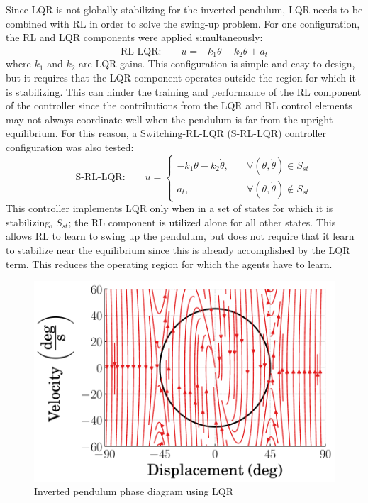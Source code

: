 Since LQR is not globally stabilizing for the inverted pendulum,
LQR needs to be combined with RL in order to solve the swing-up problem.
%
%
For one configuration, the RL and LQR components were applied simultaneously:
%
\begin{equation}
    \qquad\qquad\text{RL-LQR:} \qquad  u= -k_1\theta - k_2\dot{\theta} + a_t \qquad
\label{eq_chap2:RL_LQR_controller}
\end{equation}
%
where $k_1$ and $k_2$ are LQR gains. 
This configuration is simple and easy to design, but it requires that the LQR component operates outside the region for which it is stabilizing. This can hinder the training and performance of the RL component of the controller since the contributions from the LQR and RL control elements may not always coordinate well when the pendulum is far from the upright equilibrium. For this reason, a Switching-RL-LQR (S-RL-LQR) controller configuration was also tested:
%
\begin{equation}
    \qquad\qquad\text{S-RL-LQR:} \qquad u= 
\left\{
    \begin{array}{cl}
        -k_1\theta - k_2\dot{\theta}, & \quad \forall (\theta, \dot{\theta}) \in S_{st}\\
        a_t, & \quad \forall(\theta,\dot{\theta})\notin S_{st}
    \end{array}
    \right. \qquad
\label{eq_chap2:S_RL_LQR_controller}
\end{equation}
%
This controller implements LQR only when in a set of states for which it is stabilizing, $S_{st}$; the RL component is utilized alone for all other states. This allows RL to learn to swing up the pendulum, but does not require that it learn to stabilize near the equilibrium since this is already accomplished by the LQR term. This reduces the operating region for which the agents have to learn.
%
\begin{figure}[t]
    \centering
    \includegraphics[scale=0.65]{figures/figures_RL_model_based_control/stable_region}
    \caption{Inverted pendulum phase diagram using LQR}
    \label{fig_chap2:switching_phase_diagram}
\end{figure}

